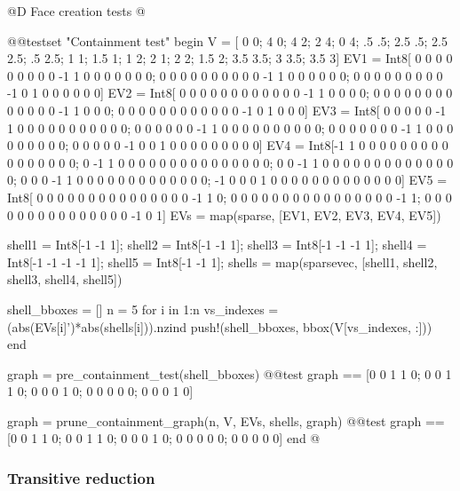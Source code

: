 @D Face creation tests
@{@@testset "Containment test" begin
    V = [  0   0;    4   0;    4   2;   2   4;  0 4;
          .5  .5;  2.5  .5;  2.5 2.5;  .5 2.5;
           1   1;  1.5   1;    1   2;
           2   1;    2   2;  1.5   2;
         3.5 3.5;    3 3.5;  3.5   3]
    EV1 = Int8[ 0  0  0  0  0  0  0  0  0 -1  1  0  0  0  0  0  0  0;
                0  0  0  0  0  0  0  0  0  0 -1  1  0  0  0  0  0  0;
                0  0  0  0  0  0  0  0  0 -1  0  1  0  0  0  0  0  0]
    EV2 = Int8[ 0  0  0  0  0  0  0  0  0  0  0  0 -1  1  0  0  0  0;
                0  0  0  0  0  0  0  0  0  0  0  0  0 -1  1  0  0  0;
                0  0  0  0  0  0  0  0  0  0  0  0 -1  0  1  0  0  0]
    EV3 = Int8[ 0  0  0  0  0 -1  1  0  0  0  0  0  0  0  0  0  0  0;
                0  0  0  0  0  0 -1  1  0  0  0  0  0  0  0  0  0  0;
                0  0  0  0  0  0  0 -1  1  0  0  0  0  0  0  0  0  0;
                0  0  0  0  0 -1  0  0  1  0  0  0  0  0  0  0  0  0]
    EV4 = Int8[-1  1  0  0  0  0  0  0  0  0  0  0  0  0  0  0  0  0;
                0 -1  1  0  0  0  0  0  0  0  0  0  0  0  0  0  0  0;
                0  0 -1  1  0  0  0  0  0  0  0  0  0  0  0  0  0  0;
                0  0  0 -1  1  0  0  0  0  0  0  0  0  0  0  0  0  0;
               -1  0  0  0  1  0  0  0  0  0  0  0  0  0  0  0  0  0]
    EV5 = Int8[ 0  0  0  0  0  0  0  0  0  0  0  0  0  0  0 -1  1  0;
                0  0  0  0  0  0  0  0  0  0  0  0  0  0  0  0 -1  1;
                0  0  0  0  0  0  0  0  0  0  0  0  0  0  0 -1  0  1]
    EVs = map(sparse, [EV1, EV2, EV3, EV4, EV5])
    
    shell1 = Int8[-1 -1  1];
    shell2 = Int8[-1 -1  1];
    shell3 = Int8[-1 -1 -1  1];
    shell4 = Int8[-1 -1 -1 -1  1];
    shell5 = Int8[-1 -1  1];
    shells = map(sparsevec, [shell1, shell2, shell3, shell4, shell5])
    
    shell_bboxes = []
    n = 5
    for i in 1:n
        vs_indexes = (abs(EVs[i]')*abs(shells[i])).nzind
        push!(shell_bboxes, bbox(V[vs_indexes, :]))
    end

    graph = pre_containment_test(shell_bboxes)
    @@test graph == [0 0 1 1 0; 0 0 1 1 0; 0 0 0 1 0; 0 0 0 0 0; 0 0 0 1 0]

    graph = prune_containment_graph(n, V, EVs, shells, graph)
    @@test graph == [0 0 1 1 0; 0 0 1 1 0; 0 0 0 1 0; 0 0 0 0 0; 0 0 0 0 0]
end
@}

\subsubsection{Transitive reduction}
\label{sec:transitivered_test}

